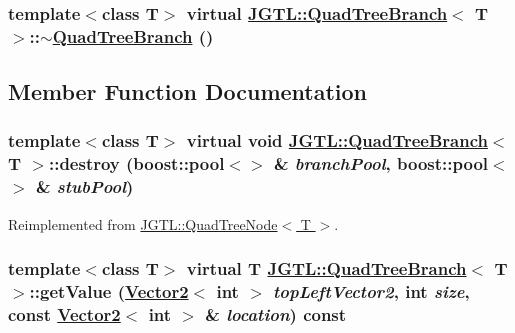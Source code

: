 \hypertarget{class_j_g_t_l_1_1_quad_tree_branch_57c133b54176b9b48bfab059cd194cb2}{
\subsubsection[$\sim$QuadTreeBranch]{\setlength{\rightskip}{0pt plus 5cm}template$<$class T$>$ virtual \hyperlink{class_j_g_t_l_1_1_quad_tree_branch}{JGTL::Quad\-Tree\-Branch}$<$ T $>$::$\sim$\hyperlink{class_j_g_t_l_1_1_quad_tree_branch}{Quad\-Tree\-Branch} ()}}
\label{class_j_g_t_l_1_1_quad_tree_branch_57c133b54176b9b48bfab059cd194cb2}




\subsection{Member Function Documentation}
\hypertarget{class_j_g_t_l_1_1_quad_tree_branch_ee97ca947b60a3cd9374f8decd1392d8}{
\subsubsection[destroy]{\setlength{\rightskip}{0pt plus 5cm}template$<$class T$>$ virtual void \hyperlink{class_j_g_t_l_1_1_quad_tree_branch}{JGTL::Quad\-Tree\-Branch}$<$ T $>$::destroy (boost::pool$<$$>$ \& {\em branch\-Pool}, boost::pool$<$$>$ \& {\em stub\-Pool})}}
\label{class_j_g_t_l_1_1_quad_tree_branch_ee97ca947b60a3cd9374f8decd1392d8}




Reimplemented from \hyperlink{class_j_g_t_l_1_1_quad_tree_node_c73b9973bed0498532647bd3ebfdaddb}{JGTL::Quad\-Tree\-Node$<$ T $>$}.\hypertarget{class_j_g_t_l_1_1_quad_tree_branch_4354d8a11f9092f3f189f0eef4d2ffff}{
\subsubsection[getValue]{\setlength{\rightskip}{0pt plus 5cm}template$<$class T$>$ virtual T \hyperlink{class_j_g_t_l_1_1_quad_tree_branch}{JGTL::Quad\-Tree\-Branch}$<$ T $>$::get\-Value (\hyperlink{class_j_g_t_l_1_1_vector2}{Vector2}$<$ int $>$ {\em top\-Left\-Vector2}, int {\em size}, const \hyperlink{class_j_g_t_l_1_1_vector2}{Vector2}$<$ int $>$ \& {\em location}) const}}
\label{class_j_g_t_l_1_1_quad_tree_branch_4354d8a11f9092f3f189f0eef4d2ffff}




